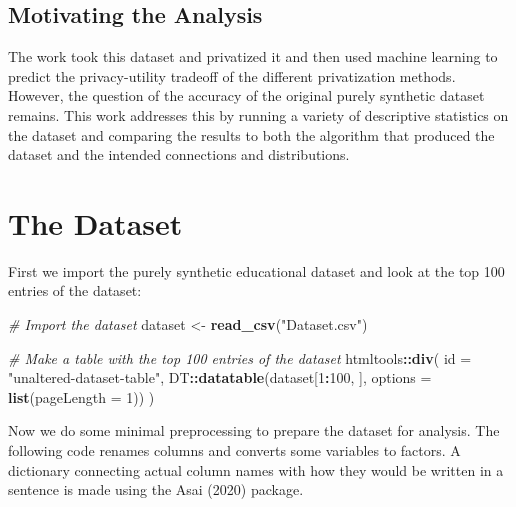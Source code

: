 \documentclass[
  twocolumn]{article}
\newenvironment{Shaded}{\begin{snugshade}}{\end{snugshade}}
\newcommand{\AttributeTok}[1]{\textcolor[rgb]{0.13,0.29,0.53}{#1}}
\newcommand{\CommentTok}[1]{\textcolor[rgb]{0.56,0.35,0.01}{\textit{#1}}}
\newcommand{\DecValTok}[1]{\textcolor[rgb]{0.00,0.00,0.81}{#1}}
\newcommand{\FunctionTok}[1]{\textcolor[rgb]{0.13,0.29,0.53}{\textbf{#1}}}
\newcommand{\NormalTok}[1]{#1}
\newcommand{\OtherTok}[1]{\textcolor[rgb]{0.56,0.35,0.01}{#1}}
\newcommand{\SpecialCharTok}[1]{\textcolor[rgb]{0.81,0.36,0.00}{\textbf{#1}}}
\newcommand{\StringTok}[1]{\textcolor[rgb]{0.31,0.60,0.02}{#1}}
\begin{document}
\subsection{Motivating the Analysis}\label{motivating-the-analysis}

The work took this dataset and privatized it and then used machine
learning to predict the privacy-utility tradeoff of the different
privatization methods. However, the question of the accuracy of the
original purely synthetic dataset remains. This work addresses this by
running a variety of descriptive statistics on the dataset and comparing
the results to both the algorithm that produced the dataset and the
intended connections and distributions.

\section{The Dataset}\label{the-dataset}

First we import the purely synthetic educational dataset and look at the
top 100 entries of the dataset:

\begin{Shaded}
\begin{Highlighting}[]
\CommentTok{\# Import the dataset}
\NormalTok{dataset }\OtherTok{\textless{}{-}} \FunctionTok{read\_csv}\NormalTok{(}\StringTok{"Dataset.csv"}\NormalTok{)}

\CommentTok{\# Make a table with the top 100 entries of the dataset}
\NormalTok{htmltools}\SpecialCharTok{::}\FunctionTok{div}\NormalTok{(}
  \AttributeTok{id =} \StringTok{"unaltered{-}dataset{-}table"}\NormalTok{,}
\NormalTok{  DT}\SpecialCharTok{::}\FunctionTok{datatable}\NormalTok{(dataset[}\DecValTok{1}\SpecialCharTok{:}\DecValTok{100}\NormalTok{, ],}
              \AttributeTok{options =} \FunctionTok{list}\NormalTok{(}\AttributeTok{pageLength =} \DecValTok{1}\NormalTok{))}
\NormalTok{)}
\end{Highlighting}
\end{Shaded}

Now we do some minimal preprocessing to prepare the dataset for
analysis. The following code renames columns and converts some variables
to factors. A dictionary connecting actual column names with how they
would be written in a sentence is made using the Asai (2020) package.
\end{document}
